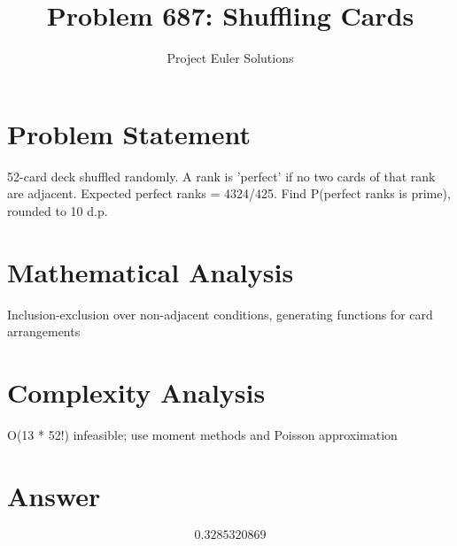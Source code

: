 \documentclass[11pt]{article}
\title{Problem 687: Shuffling Cards}
\author{Project Euler Solutions}
\date{}
\begin{document}
\maketitle

\section{Problem Statement}

52-card deck shuffled randomly. A rank is 'perfect' if no two cards of that rank are adjacent. Expected perfect ranks = 4324/425. Find P(perfect ranks is prime), rounded to 10 d.p.

\section{Mathematical Analysis}

Inclusion-exclusion over non-adjacent conditions, generating functions for card arrangements

\section{Complexity Analysis}

O(13 * 52!) infeasible; use moment methods and Poisson approximation

\section{Answer}

\[
\boxed{0.3285320869}
\]
\end{document}
